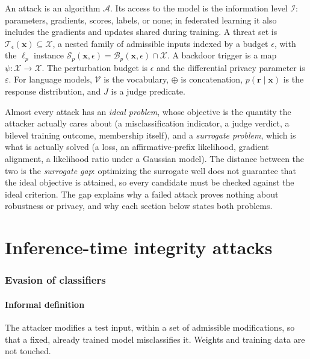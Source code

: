 \documentclass[10pt,a4paper]{extarticle}
\theoremstyle{definition}
\newcommand{\X}{\mathcal{X}}
\newcommand{\x}{\mathbf{x}}
\newcommand{\B}{\mathcal{B}}
\newcommand{\T}{\mathcal{T}}
\newcommand{\Info}{\mathcal{I}}
\begin{document}
An attack is an algorithm $\mathcal{A}$. Its access to the model is the information level $\Info$: parameters, gradients, scores, labels, or none; in federated learning it also includes the gradients and updates shared during training. A threat set is $\T_\epsilon(\x)\subseteq\X$, a nested family of admissible inputs indexed by a budget $\epsilon$, with the $\ell_p$ instance $\mathcal{S}_p(\x,\epsilon)=\B_p(\x,\epsilon)\cap\X$. A backdoor trigger is a map $\psi:\X\to\X$. The perturbation budget is $\epsilon$ and the differential privacy parameter is $\varepsilon$. For language models, $\mathcal{V}$ is the vocabulary, $\oplus$ is concatenation, $p(\mathbf{r}\mid\x)$ is the response distribution, and $J$ is a judge predicate.

\begin{keybox}
Almost every attack has an \emph{ideal problem}, whose objective is the quantity the attacker actually cares about (a misclassification indicator, a judge verdict, a bilevel training outcome, membership itself), and a \emph{surrogate problem}, which is what is actually solved (a loss, an affirmative-prefix likelihood, gradient alignment, a likelihood ratio under a Gaussian model). The distance between the two is the \emph{surrogate gap}: optimizing the surrogate well does not guarantee that the ideal objective is attained, so every candidate must be checked against the ideal criterion. The gap explains why a failed attack proves nothing about robustness or privacy, and why each section below states both problems.
\end{keybox}

\part{Inference-time integrity attacks}

\section{Evasion of classifiers}\label{sec:evasion}

\subsection{Informal definition}

The attacker modifies a test input, within a set of admissible modifications, so that a fixed, already trained model misclassifies it. Weights and training data are not touched.
\end{document}
